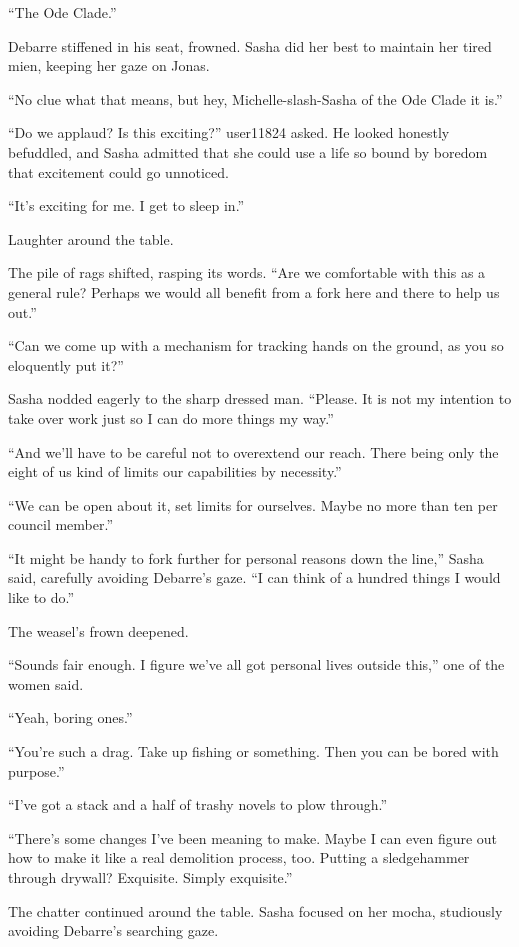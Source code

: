 ``The Ode Clade.''

Debarre stiffened in his seat, frowned. Sasha did her best to maintain her tired mien, keeping her gaze on Jonas.

``No clue what that means, but hey, Michelle-slash-Sasha of the Ode Clade it is.''

``Do we applaud? Is this exciting?'' user11824 asked. He looked honestly befuddled, and Sasha admitted that she could use a life so bound by boredom that excitement could go unnoticed.

``It's exciting for me. I get to sleep in.''

Laughter around the table.

The pile of rags shifted, rasping its words. ``Are we comfortable with this as a general rule? Perhaps we would all benefit from a fork here and there to help us out.''

``Can we come up with a mechanism for tracking hands on the ground, as you so eloquently put it?''

Sasha nodded eagerly to the sharp dressed man. ``Please. It is not my intention to take over work just so I can do more things my way.''

``And we'll have to be careful not to overextend our reach. There being only the eight of us kind of limits our capabilities by necessity.''

``We can be open about it, set limits for ourselves. Maybe no more than ten per council member.''

``It might be handy to fork further for personal reasons down the line,'' Sasha said, carefully avoiding Debarre's gaze. ``I can think of a hundred things I would like to do.''

The weasel's frown deepened.

``Sounds fair enough. I figure we've all got personal lives outside this,'' one of the women said.

``Yeah, boring ones.''

``You're such a drag. Take up fishing or something. Then you can be bored with purpose.''

``I've got a stack and a half of trashy novels to plow through.''

``There's some changes I've been meaning to make. Maybe I can even figure out how to make it like a real demolition process, too. Putting a sledgehammer through drywall? Exquisite. Simply exquisite.''

The chatter continued around the table. Sasha focused on her mocha, studiously avoiding Debarre's searching gaze.

